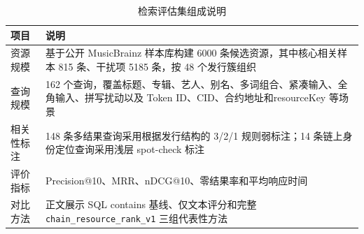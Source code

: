 \begin{table}[htbp]
    \linespread{1.45}
    \songti
    \centering
    \caption{检索评估集组成说明}\label{tab:appendix_ranking_dataset}
    \begin{tabular}{|l|p{8.8cm}|}
        \hline
        项目    & 说明                                                                        \\ \hline
        资源规模  & 基于公开 MusicBrainz 样本库构建 6000 条候选资源，其中核心相关样本 815 条、干扰项 5185 条，按 48 个发行簇组织 \\ \hline
        查询规模  & 162 个查询，覆盖标题、专辑、艺人、别名、多词组合、紧凑输入、全角输入、拼写扰动以及 Token ID、CID、合约地址和resourceKey 等场景 \\ \hline
        相关性标注 & 148 条多结果查询采用根据发行结构的 3/2/1 规则弱标注；14 条链上身份定位查询采用浅层 spot-check 标注            \\ \hline
        评价指标  & Precision@10、MRR、nDCG@10、零结果率和平均响应时间                                      \\ \hline
        对比方法  & 正文展示 SQL contains 基线、仅文本评分和完整\texttt{chain\_resource\_rank\_v1} 三组代表性方法       \\ \hline
    \end{tabular}
\end{table}
